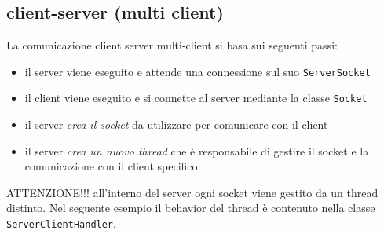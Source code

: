 \documentclass{article}
\begin{document}
\subsection{client-server (multi client)} 
La comunicazione client server multi-client si basa sui seguenti passi:
\begin{itemize}
\item il server viene eseguito e attende una connessione sul suo \texttt{ServerSocket}
\item il client viene eseguito e si connette al server mediante la classe \texttt{Socket}
\item il server \emph{crea il socket} da utilizzare per comunicare con il  client
\item il server \emph{crea un nuovo thread} che \`e responsabile di gestire il socket e la comunicazione con il client specifico
\end{itemize}
ATTENZIONE!!! all'interno del server ogni socket viene gestito da un thread distinto. Nel seguente esempio il behavior del thread \`e contenuto nella classe \texttt{ServerClientHandler}.
\end{document}
